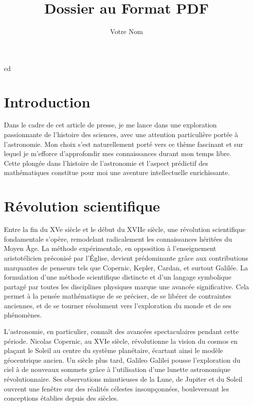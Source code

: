 cd\documentclass{article}
\title{Dossier au Format PDF}
\author{Votre Nom}
\begin{document}
\maketitle

\tableofcontents %
\newpage

\section{Introduction}
 Dans le cadre de cet article de presse, je me lance dans une exploration passionnante de l'histoire des sciences, avec une attention particulière portée à l'astronomie. Mon choix s'est naturellement porté vers ce thème fascinant et sur lequel je m'efforce d'approfondir mes connaissances durant mon temps libre. Cette plongée dans l'histoire de l'astronomie et l'aspect prédictif des mathématiques constitue pour moi une aventure intellectuelle enrichissante. 

\section{Révolution scientifique} 

Entre la fin du XVe siècle et le début du XVIIe siècle, une révolution scientifique fondamentale s'opère, remodelant radicalement les connaissances héritées du Moyen Âge. La méthode expérimentale, en opposition à l'enseignement aristotélicien préconisé par l'Église, devient prédominante grâce aux contributions marquantes de penseurs tels que Copernic, Kepler, Cardan, et surtout Galilée. La formulation d'une méthode scientifique distincte et d'un langage symbolique partagé par toutes les disciplines physiques marque une avancée significative. Cela permet à la pensée mathématique de se préciser, de se libérer de contraintes anciennes, et de se tourner résolument vers l'exploration du monde et de ses phénomènes.

L'astronomie, en particulier, connaît des avancées spectaculaires pendant cette période. Nicolas Copernic, au XVIe siècle, révolutionne la vision du cosmos en plaçant le Soleil au centre du système planétaire, écartant ainsi le modèle géocentrique ancien. Un siècle plus tard, Galileo Galilei pousse l'exploration du ciel à de nouveaux sommets grâce à l'utilisation d'une lunette astronomique révolutionnaire. Ses observations minutieuses de la Lune, de Jupiter et du Soleil ouvrent une fenêtre sur des réalités célestes insoupçonnées, bouleversant les conceptions établies depuis des siècles.
\end{document}

